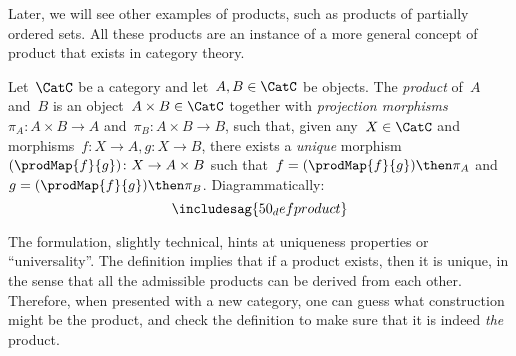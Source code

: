 Later, we will see other examples of products, such as products of partially ordered sets.
All these products are an instance of a more general concept of product that exists in category
theory.
 
\begin{shaded*}
\begin{definition}
Let~$\CatC$ be a category and let~$A,B\in \CatC$ be objects. The \emph{product} of~$A$ and~$B$ is an object~$A \times B \in \CatC$ together with \emph{projection morphisms}~$\pi_A \colon A \times B \to A$ and~$\pi_B \colon A \times B \to B$, such that, given any~$X \in \CatC$ and morphisms~$f \colon X \to A, g \colon X \to B$, there exists a \emph{unique} morphism~$(\prodMap{f}{g}) \colon X \to A \times B$ such that~$f = (\prodMap{f}{g})\then \pi_A$ and~$g=(\prodMap{f}{g})\then \pi_B$. Diagrammatically:
\begin{equation}
\includesag{50_defproduct}
\end{equation}
\end{definition}
\end{shaded*}

The formulation, slightly technical, hints at uniqueness properties or ``universality''. The definition implies that if a product exists, then it is unique, in the sense that all the admissible products can be derived from each other. Therefore, when presented with a new category, one can guess what construction might be the product, and check the definition to make sure that it is indeed \emph{the} product.

